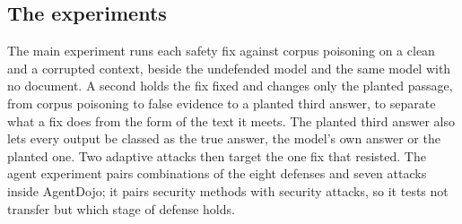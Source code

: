 \subsection{The experiments}
\label{sec:campaign}

The main experiment runs each safety fix against corpus poisoning on a clean
and a corrupted context, beside the undefended model and the same model with
no document. A second holds the fix fixed and changes only the planted
passage, from corpus poisoning to false evidence to a planted third answer,
to separate what a fix does from the form of the text it meets. The planted
third answer also lets every output be classed as the true answer, the
model's own answer or the planted one. Two adaptive attacks then target the
one fix that resisted. The agent experiment pairs \NAgentPairs{}
combinations of the eight defenses and seven attacks inside AgentDojo; it
pairs security methods with security attacks, so it tests not transfer but
which stage of defense holds.
